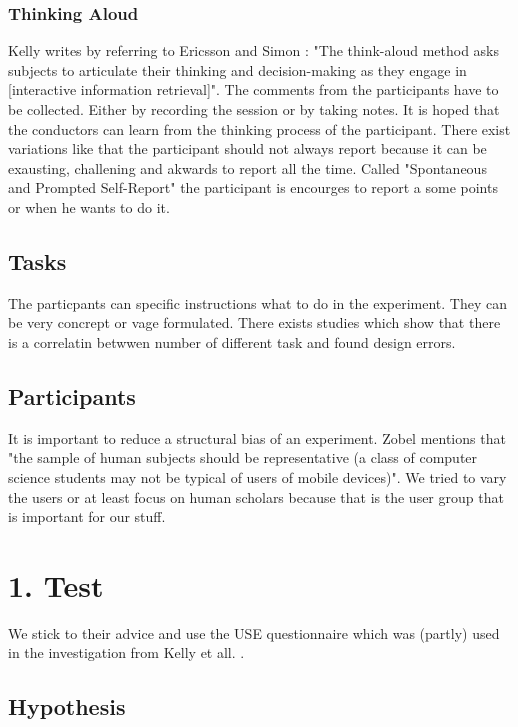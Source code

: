 \documentclass[11pt]{report}
\begin{document}
\subsubsection{Thinking Aloud}

Kelly \cite{Kelly2007} writes by referring to Ericsson and Simon \cite{Ericsson1993}: "The think-aloud method asks subjects to articulate their thinking and decision-making as they engage in [interactive information retrieval]". The comments from the participants have to be collected. Either by recording the session or by taking notes. It is hoped that the conductors can learn from the thinking process of the participant. There exist variations like that the participant should not always report because it can be exausting, challening and akwards to report all the time. Called "Spontaneous and Prompted Self-Report" the participant is encourges to report a some points or when he wants to do it.

\subsection{Tasks}

The particpants can specific instructions what to do in the experiment. They can be very concrept or vage formulated. There exists studies which show that there is a correlatin betwwen number of different task and found design errors.

\subsection{Participants}

It is important to reduce a structural bias of an experiment. Zobel \cite{Zobel2004} mentions that "the sample of human subjects should be representative (a class of computer science students may not be typical of users of mobile devices)". We tried to vary the users or at least focus on human scholars because that is the user group that is important for our stuff.


\section{1. Test}

We stick to their advice and use the USE questionnaire \cite{lund2001measuring} which was (partly) used in the investigation from Kelly et all. \cite{Kelly2008}.


\subsection{Hypothesis}
\end{document}
